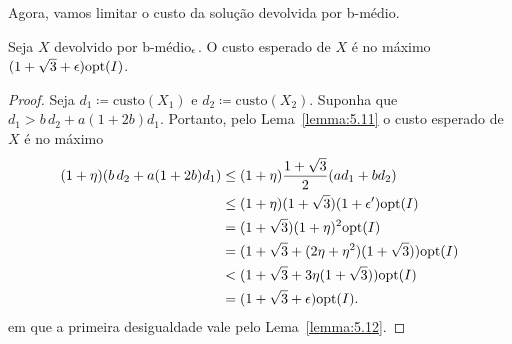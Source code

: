 Agora, vamos limitar o custo da solução devolvida por {\sc b-médio}.

\begin{lemma}
    Seja $X$ devolvido por {\sc b-médio}$_\epsilon$. O custo esperado de $X$ é no máximo $(1 + \sqrt{3} + \epsilon )\mathrm{opt}(I)$.
\end{lemma}
\begin{proof}
    Seja $d_1 \coloneqq \text{custo}(X_1)$ e $d_2 \coloneqq \text{custo}(X_2)$. Suponha que $d_1 >  b\, d_2 + a (1 + 2b)d_1$. Portanto, pelo Lema~\ref{lemma:5.11} o custo esperado de $X$ é no máximo
    \begin{align*}
        ( 1 + \eta) (b\,d_2 + a (1 + 2b)d_1) &\leq (1 + \eta) \frac{1 + \sqrt{3}}{2}(ad_1 + b d_2) \\
        &\leq (1 + \eta) (1 + \sqrt{3}) (1 + \epsilon') \mathrm{opt}(I) \\
        &= (1 + \sqrt{3}) (1 + \eta)^2 \mathrm{opt}(I)\\
        & = (1 + \sqrt{3} + (2\eta + \eta^2) (1+\sqrt{3})) \mathrm{opt}(I)\\
        &< (1 + \sqrt{3} + 3\eta (1 +\sqrt{3}))\mathrm{opt}(I)\\
        & = (1 + \sqrt{3} + \epsilon) \mathrm{opt}(I).
    \end{align*}
    em que a primeira desigualdade vale pelo Lema~\ref{lemma:5.12}.
\end{proof}